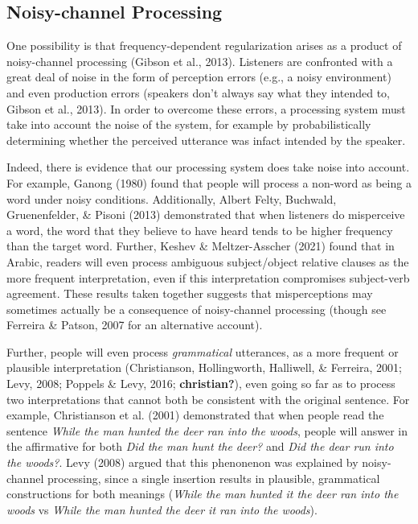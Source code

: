 \documentclass[10pt, letterpaper]{article}
\begin{document}
\hypertarget{noisy-channel-processing}{%
\subsection{Noisy-channel Processing}\label{noisy-channel-processing}}

One possibility is that frequency-dependent regularization arises as a
product of noisy-channel processing (Gibson et al., 2013). Listeners are
confronted with a great deal of noise in the form of perception errors
(e.g., a noisy environment) and even production errors (speakers don't
always say what they intended to, Gibson et al., 2013). In order to
overcome these errors, a processing system must take into account the
noise of the system, for example by probabilistically determining
whether the perceived utterance was infact intended by the speaker.

Indeed, there is evidence that our processing system does take noise
into account. For example, Ganong (1980) found that people will process
a non-word as being a word under noisy conditions. Additionally, Albert
Felty, Buchwald, Gruenenfelder, \& Pisoni (2013) demonstrated that when
listeners do misperceive a word, the word that they believe to have
heard tends to be higher frequency than the target word. Further, Keshev
\& Meltzer-Asscher (2021) found that in Arabic, readers will even
process ambiguous subject/object relative clauses as the more frequent
interpretation, even if this interpretation compromises subject-verb
agreement. These results taken together suggests that misperceptions may
sometimes actually be a consequence of noisy-channel processing (though
see Ferreira \& Patson, 2007 for an alternative account).

Further, people will even process \emph{grammatical} utterances, as a
more frequent or plausible interpretation (Christianson, Hollingworth,
Halliwell, \& Ferreira, 2001; Levy, 2008; Poppels \& Levy, 2016;
\textbf{christian?}), even going so far as to process two
interpretations that cannot both be consistent with the original
sentence. For example, Christianson et al. (2001) demonstrated that when
people read the sentence \emph{While the man hunted the deer ran into
the woods}, people will answer in the affirmative for both \emph{Did the
man hunt the deer?} and \emph{Did the dear run into the woods?}. Levy
(2008) argued that this phenonenon was explained by noisy-channel
processing, since a single insertion results in plausible, grammatical
constructions for both meanings (\emph{While the man hunted it the deer
ran into the woods} vs \emph{While the man hunted the deer it ran into
the woods}).
\end{document}
